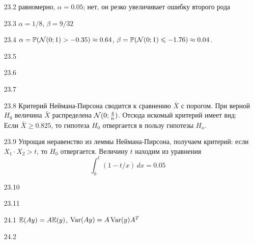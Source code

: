 \protect \hypertarget {soln:23.2}{}
\begin{solution}{{23.2}}
  равномерно, $\alpha=0.05$; нет, он резко увеличивает ошибку второго рода
\end{solution}
\protect \hypertarget {soln:23.3}{}
\begin{solution}{{23.3}}
  $\alpha = 1/8$, $\beta = 9/32$
\end{solution}
\protect \hypertarget {soln:23.4}{}
\begin{solution}{{23.4}}
  $\alpha = \mathbb{P}(\mathcal{N}(0;1) > -0.35) \approx 0.64$, $\beta = \mathbb{P}(\mathcal{N}(0;1) \leqslant -1.76) \approx 0.04$.
\end{solution}
\protect \hypertarget {soln:23.5}{}
\begin{solution}{{23.5}}
\end{solution}
\protect \hypertarget {soln:23.6}{}
\begin{solution}{{23.6}}
\end{solution}
\protect \hypertarget {soln:23.7}{}
\begin{solution}{{23.7}}

\end{solution}
\protect \hypertarget {soln:23.8}{}
\begin{solution}{{23.8}}
Критерий Неймана-Пирсона сводится к сравнению $\bar X$ с порогом. При верной $H_0$ величина $\bar X$ распределена $\mathcal{N}(0; \frac{4}{n})$.
Отсюда искомый критерий имеет вид:
Если $\bar X  \geqslant 0.825$, то гипотеза ${H_0}$ отвергается в пользу гипотезы ${H_a}$.
\end{solution}
\protect \hypertarget {soln:23.9}{}
\begin{solution}{{23.9}}
  Упрощая неравенство из леммы Неймана-Пирсона, получаем критерий: если $X_1\cdot X_2 >t$, то $H_0$ отвергается. Величину $t$ находим из уравнения
\[
\int_0^t (1 - t/x) \, dx = 0.05
\]
\end{solution}
\protect \hypertarget {soln:23.10}{}
\begin{solution}{{23.10}}

\end{solution}
\protect \hypertarget {soln:23.11}{}
\begin{solution}{{23.11}}
\end{solution}
\protect \hypertarget {soln:24.1}{}
\begin{solution}{{24.1}}
$\mathbb{E}(Ay)=A\mathbb{E}(y)$, $\operatorname{Var}(Ay)=A\operatorname{Var}(y)A^T$
\end{solution}
\protect \hypertarget {soln:24.2}{}
\begin{solution}{{24.2}}

\end{solution}

